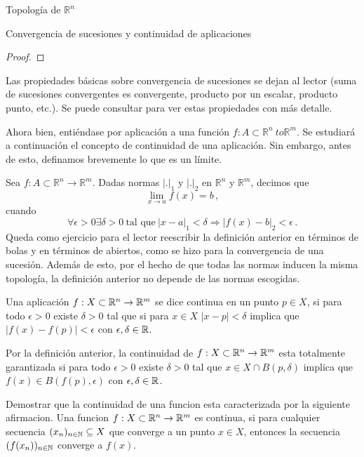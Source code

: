 \begin{chapter}{Topología de $\mathbb{R}^n$}
\begin{section}{Convergencia de sucesiones y continuidad de aplicaciones}
\begin{proof}
\end{proof}

Las propiedades básicas sobre convergencia de sucesiones se dejan al lector (suma de sucesiones convergentes es convergente, producto por un escalar, producto punto, etc.). Se puede consultar \cite{lima2004curso} para ver estas propiedades con más detalle.

Ahora bien, entiéndase por aplicación a una función $f: A \subset \mathbb{R}^n \ to \mathbb{R}^m$. Se estudiará a continuación el concepto de continuidad de una aplicación. Sin embargo, antes de esto, definamos brevemente lo que es un límite. 

\begin{defn}

Sea $f: A\subset \mathbb{R}^n \to \mathbb{R}^m$. Dadas normas $|.|_1$ y $|.|_2$ en $\mathbb{R}^n$ y $\mathbb{R}^m$, decimos que
$$\lim_{x \to a} f(x) = b\,,$$
cuando
$$\forall \epsilon > 0 \exists \delta > 0 \ \text{tal que} \ |x-a|_1 < \delta \Rightarrow |f(x) - b|_2 < \epsilon\,.$$
Queda como ejercicio para el lector reescribir la definición anterior en términos de bolas y en términos de abiertos, como se hizo para la convergencia de una sucesión. Además de esto, por el hecho de que todas las normas inducen la misma topología, la definición anterior no depende de las normas escogidas.  

\end{defn}



\begin{defn}
Una aplicación $f: X \subset \mathbb{R}^n \to \mathbb{R}^m$ se dice continua en un punto $p \in X$, si para todo $\epsilon > 0$ existe $\delta > 0$ tal que si para $x \in X$ $|x - p| < \delta$ implica que $|f(x) - f(p)| < \epsilon$ con $\epsilon, \delta \in \mathbb{R}$.
\end{defn}

\begin{rem}
Por la definición anterior, la continuidad de $f: X \subset \mathbb{R}^n \to \mathbb{R}^m$ esta totalmente garantizada si para todo $\epsilon > 0$ existe $\delta > 0$ tal que $x \in X \cap B(p, \delta)$ implica que $f(x) \in B(f(p), \epsilon)$ con $\epsilon, \delta \in \mathbb{R}$.
\end{rem}

\begin{exer}
Demostrar que la continuidad de una funcion esta caracterizada por la siguiente afirmacion. Una funcion $f: X \subset \mathbb{R}^n \to \mathbb{R}^m$ es continua, si para cualquier secuencia $(x_n)_{n \in \mathbb{N}} \subseteq X$ que converge a un punto $x \in X$, entonces la secuencia $(f(x_n))_{n \in \mathbb{N}}$ converge a $f(x)$.
\end{exer}


\end{section}
\end{chapter}
